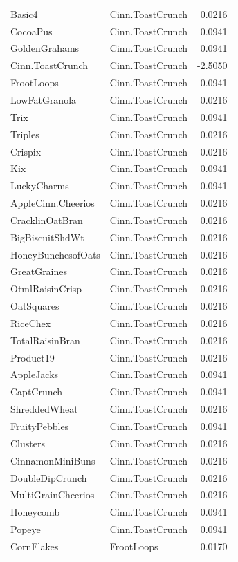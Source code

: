 \begin{longtable}{llr}
Basic4 & Cinn.ToastCrunch & 0.0216 \\
CocoaPus & Cinn.ToastCrunch & 0.0941 \\
GoldenGrahams & Cinn.ToastCrunch & 0.0941 \\
Cinn.ToastCrunch & Cinn.ToastCrunch & -2.5050 \\
FrootLoops & Cinn.ToastCrunch & 0.0941 \\
LowFatGranola & Cinn.ToastCrunch & 0.0216 \\
Trix & Cinn.ToastCrunch & 0.0941 \\
Triples & Cinn.ToastCrunch & 0.0216 \\
Crispix & Cinn.ToastCrunch & 0.0216 \\
Kix & Cinn.ToastCrunch & 0.0941 \\
LuckyCharms & Cinn.ToastCrunch & 0.0941 \\
AppleCinn.Cheerios & Cinn.ToastCrunch & 0.0216 \\
CracklinOatBran & Cinn.ToastCrunch & 0.0216 \\
BigBiscuitShdWt & Cinn.ToastCrunch & 0.0216 \\
HoneyBunchesofOats & Cinn.ToastCrunch & 0.0216 \\
GreatGraines & Cinn.ToastCrunch & 0.0216 \\
OtmlRaisinCrisp & Cinn.ToastCrunch & 0.0216 \\
OatSquares & Cinn.ToastCrunch & 0.0216 \\
RiceChex & Cinn.ToastCrunch & 0.0216 \\
TotalRaisinBran & Cinn.ToastCrunch & 0.0216 \\
Product19 & Cinn.ToastCrunch & 0.0216 \\
AppleJacks & Cinn.ToastCrunch & 0.0941 \\
CaptCrunch & Cinn.ToastCrunch & 0.0941 \\
ShreddedWheat & Cinn.ToastCrunch & 0.0216 \\
FruityPebbles & Cinn.ToastCrunch & 0.0941 \\
Clusters & Cinn.ToastCrunch & 0.0216 \\
CinnamonMiniBuns & Cinn.ToastCrunch & 0.0216 \\
DoubleDipCrunch & Cinn.ToastCrunch & 0.0216 \\
MultiGrainCheerios & Cinn.ToastCrunch & 0.0216 \\
Honeycomb & Cinn.ToastCrunch & 0.0941 \\
Popeye & Cinn.ToastCrunch & 0.0941 \\
CornFlakes & FrootLoops & 0.0170 \\

\end{longtable}
